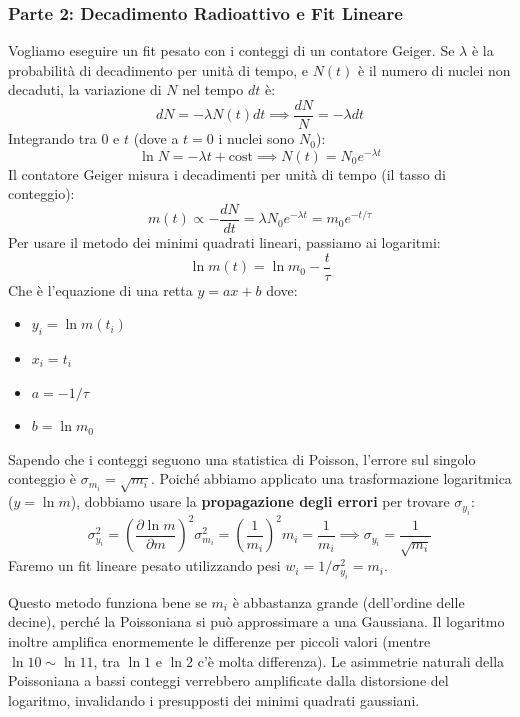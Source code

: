 \documentclass[openany,a4paper,12pt]{book}
\theoremstyle{remark}
\begin{document}
\subsubsection*{Parte 2: Decadimento Radioattivo e Fit Lineare}
Vogliamo eseguire un fit pesato con i conteggi di un contatore Geiger. Se $\lambda$ è la probabilità di decadimento per unità di tempo, e $N(t)$ è il numero di nuclei non decaduti, la variazione di $N$ nel tempo $dt$ è:
\begin{equation}
    dN = -\lambda N(t) dt \implies \frac{dN}{N} = -\lambda dt
\end{equation}
Integrando tra $0$ e $t$ (dove a $t=0$ i nuclei sono $N_0$):
\begin{equation}
    \ln N = -\lambda t + \text{cost} \implies N(t) = N_0 e^{-\lambda t}
\end{equation}
Il contatore Geiger misura i decadimenti per unità di tempo (il tasso di conteggio):
\begin{equation}
    m(t) \propto -\frac{dN}{dt} = \lambda N_0 e^{-\lambda t} = m_0 e^{-t/\tau}
\end{equation}
Per usare il metodo dei minimi quadrati lineari, passiamo ai logaritmi:
\begin{equation}
    \ln m(t) = \ln m_0 - \frac{t}{\tau}
\end{equation}
Che è l'equazione di una retta $y = ax + b$ dove:
\begin{itemize}
    \item $y_i = \ln m(t_i)$
    \item $x_i = t_i$
    \item $a = -1/\tau$
    \item $b = \ln m_0$
\end{itemize}
Sapendo che i conteggi seguono una statistica di Poisson, l'errore sul singolo conteggio è $\sigma_{m_i} = \sqrt{m_i}$. Poiché abbiamo applicato una trasformazione logaritmica ($y = \ln m$), dobbiamo usare la \textbf{propagazione degli errori} per trovare $\sigma_{y_i}$:
\begin{equation}
    \sigma_{y_i}^2 = \left( \frac{\partial \ln m}{\partial m} \right)^2 \sigma_{m_i}^2 = \left( \frac{1}{m_i} \right)^2 m_i = \frac{1}{m_i} \implies \sigma_{y_i} = \frac{1}{\sqrt{m_i}}
\end{equation}
Faremo un fit lineare pesato utilizzando pesi $w_i = 1/\sigma_{y_i}^2 = m_i$.

\begin{nota}
    Questo metodo funziona bene se $m_i$ è abbastanza grande (dell'ordine delle decine), perché la Poissoniana si può approssimare a una Gaussiana. Il logaritmo inoltre amplifica enormemente le differenze per piccoli valori (mentre $\ln 10 \sim \ln 11$, tra $\ln 1$ e $\ln 2$ c'è molta differenza). Le asimmetrie naturali della Poissoniana a bassi conteggi verrebbero amplificate dalla distorsione del logaritmo, invalidando i presupposti dei minimi quadrati gaussiani.
\end{nota}
\end{document}
